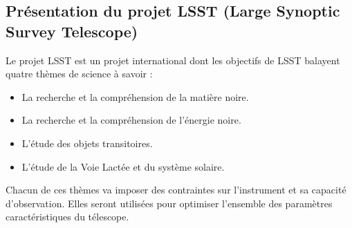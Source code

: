 \subsection{Présentation du projet LSST (Large Synoptic Survey Telescope)}
Le projet LSST  est un projet international dont les objectifs de LSST balayent quatre thèmes de science à savoir :
\begin{itemize}
    \item La recherche et la compréhension de la matière noire.
    \item La recherche et la compréhension de l'énergie noire.
    \item L'étude des objets transitoires.
    \item L'étude de la Voie Lactée et du système solaire.
\end{itemize}
Chacun de ces thèmes va imposer des contraintes sur l'instrument et sa capacité d'observation.
Elles seront utilisées pour optimiser l'ensemble des paramètres caractéristiques du télescope.
